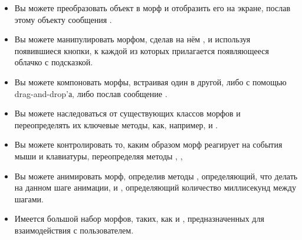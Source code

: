 \documentclass[a4paper,10pt,twoside]{book}
\begin{document}
\begin{itemize}
  \item Вы можете преобразовать объект в морф и отобразить его на экране, послав этому объекту сообщения .
  \item Вы можете манипулировать морфом, сделав на нём \metaclick, и используя появившиеся кнопки, к каждой из которых прилагается появляющееся облачко с подсказкой.
  \item Вы можете компоновать морфы, встраивая один в другой, либо с помощью drag-and-drop'а, либо послав сообщение .
  \item Вы можете наследоваться от существующих классов морфов и переопределять их ключевые методы, как, например,  и .
  \item Вы можете контролировать то, каким образом морф реагирует на события мыши и клавиатуры, переопределяя методы , , \etc
  \item Вы можете анимировать морф, определив методы , определяющий, что делать на данном шаге анимации, и , определяющий количество миллисекунд между шагами.
  \item Имеется большой набор морфов, таких, как  и , предназначенных для взаимодействия с пользователем.
\end{itemize}

\ifx\wholebook\relax\else
\end{document}

